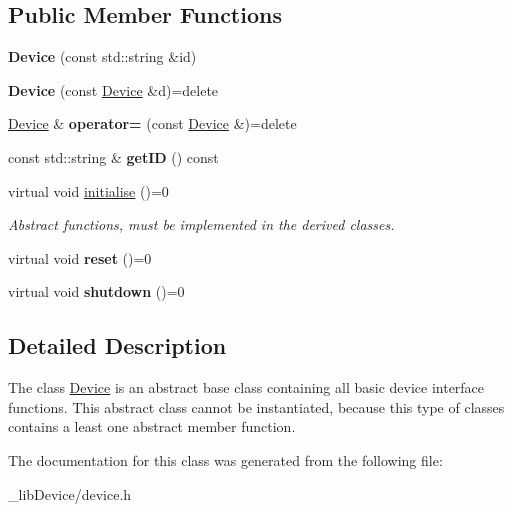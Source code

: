 \subsection*{Public Member Functions}
\begin{DoxyCompactItemize}
\item 
{\bfseries Device} (const std\+::string \&id)\hypertarget{class_device_a831fcd5aa1de172a75977ef04bbca56a}{}\label{class_device_a831fcd5aa1de172a75977ef04bbca56a}

\item 
{\bfseries Device} (const \hyperlink{class_device}{Device} \&d)=delete\hypertarget{class_device_ac396693bdad11f7cd4209da76fe651f3}{}\label{class_device_ac396693bdad11f7cd4209da76fe651f3}

\item 
\hyperlink{class_device}{Device} \& {\bfseries operator=} (const \hyperlink{class_device}{Device} \&)=delete\hypertarget{class_device_a25d835db7132fe7f8fd33ace1e19a780}{}\label{class_device_a25d835db7132fe7f8fd33ace1e19a780}

\item 
const std\+::string \& {\bfseries get\+ID} () const \hypertarget{class_device_a682e72b3243a703e7b6080f5f1c9553b}{}\label{class_device_a682e72b3243a703e7b6080f5f1c9553b}

\item 
virtual void \hyperlink{class_device_a66d75dab26ca84259877ca3fe5f2c2bd}{initialise} ()=0\hypertarget{class_device_a66d75dab26ca84259877ca3fe5f2c2bd}{}\label{class_device_a66d75dab26ca84259877ca3fe5f2c2bd}

\begin{DoxyCompactList}\small\item\em Abstract functions, must be implemented in the derived classes. \end{DoxyCompactList}\item 
virtual void {\bfseries reset} ()=0\hypertarget{class_device_a6e43162e890cb40eafb923b0c94d167a}{}\label{class_device_a6e43162e890cb40eafb923b0c94d167a}

\item 
virtual void {\bfseries shutdown} ()=0\hypertarget{class_device_aab20e3f9dc696c6a1153776d526dcc0b}{}\label{class_device_aab20e3f9dc696c6a1153776d526dcc0b}

\end{DoxyCompactItemize}


\subsection{Detailed Description}
The class \hyperlink{class_device}{Device} is an abstract base class containing all basic device interface functions. This abstract class cannot be instantiated, because this type of classes contains a least one abstract member function. 

The documentation for this class was generated from the following file\+:\begin{DoxyCompactItemize}
\item 
\+\_\+lib\+Device/device.\+h\end{DoxyCompactItemize}
